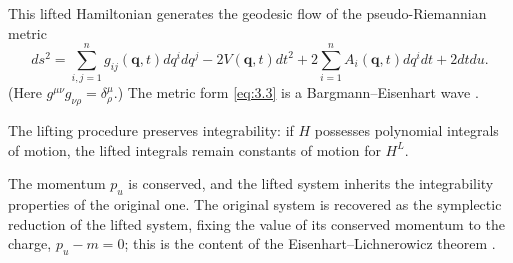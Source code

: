 \documentclass[10pt]{amsart}
\numberwithin{equation}{section}
\newcommand{\bs}{\boldsymbol}
\theoremstyle{definition}
\begin{document}
	This lifted Hamiltonian generates the geodesic flow of the pseudo-Riemannian metric
	\begin{equation} \label{eq:3.3}
		ds^2=\sum_{i,j=1}^{n} g_{ij}(\bs{q},t)dq^{i} d q^{j}-2V(\bs{q},t)dt^2+2\sum_{i=1}^{n} A_i(\bs{q},t)dq^i dt+2 dt du.
	\end{equation}
	(Here $g^{\mu\nu}g_{\nu\rho}=\delta^\mu_\rho$.) The metric form \eqref{eq:3.3} is a Bargmann–Eisenhart wave \cite{BM2013PRD}.

	The lifting procedure preserves integrability: if $H$ possesses polynomial integrals of motion, the lifted integrals remain constants of motion for $H^L$. 

The momentum $p_u$ is conserved, and the lifted system inherits the integrability properties of the original one. The original system is recovered as the symplectic reduction of the lifted system, fixing the value of its conserved momentum to the charge, $p_u-m=0$; this is the content of the Eisenhart--Lichnerowicz theorem \cite{E1928AM,Lich1955}.
		
\end{document}
